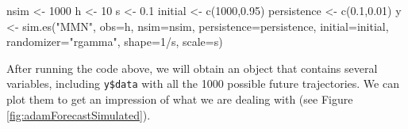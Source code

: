 \documentclass[
]{book}
\newenvironment{Shaded}{\begin{snugshade}}{\end{snugshade}}
\newcommand{\AttributeTok}[1]{\textcolor[rgb]{0.77,0.63,0.00}{#1}}
\newcommand{\ControlFlowTok}[1]{\textcolor[rgb]{0.13,0.29,0.53}{\textbf{#1}}}
\newcommand{\DecValTok}[1]{\textcolor[rgb]{0.00,0.00,0.81}{#1}}
\newcommand{\FloatTok}[1]{\textcolor[rgb]{0.00,0.00,0.81}{#1}}
\newcommand{\FunctionTok}[1]{\textcolor[rgb]{0.00,0.00,0.00}{#1}}
\newcommand{\NormalTok}[1]{#1}
\newcommand{\OtherTok}[1]{\textcolor[rgb]{0.56,0.35,0.01}{#1}}
\newcommand{\SpecialCharTok}[1]{\textcolor[rgb]{0.00,0.00,0.00}{#1}}
\newcommand{\StringTok}[1]{\textcolor[rgb]{0.31,0.60,0.02}{#1}}
\theoremstyle{definition}
\theoremstyle{definition}
\theoremstyle{definition}
\theoremstyle{definition}
\theoremstyle{remark}
\begin{document}
\begin{Shaded}
\begin{Highlighting}[]
\NormalTok{nsim }\OtherTok{\textless{}{-}} \DecValTok{1000}
\NormalTok{h }\OtherTok{\textless{}{-}} \DecValTok{10}
\NormalTok{s }\OtherTok{\textless{}{-}} \FloatTok{0.1}
\NormalTok{initial }\OtherTok{\textless{}{-}} \FunctionTok{c}\NormalTok{(}\DecValTok{1000}\NormalTok{,}\FloatTok{0.95}\NormalTok{)}
\NormalTok{persistence }\OtherTok{\textless{}{-}} \FunctionTok{c}\NormalTok{(}\FloatTok{0.1}\NormalTok{,}\FloatTok{0.01}\NormalTok{)}
\NormalTok{y }\OtherTok{\textless{}{-}} \FunctionTok{sim.es}\NormalTok{(}\StringTok{"MMN"}\NormalTok{, }\AttributeTok{obs=}\NormalTok{h, }\AttributeTok{nsim=}\NormalTok{nsim, }\AttributeTok{persistence=}\NormalTok{persistence,}
            \AttributeTok{initial=}\NormalTok{initial, }\AttributeTok{randomizer=}\StringTok{"rgamma"}\NormalTok{,}
            \AttributeTok{shape=}\DecValTok{1}\SpecialCharTok{/}\NormalTok{s, }\AttributeTok{scale=}\NormalTok{s)}
\end{Highlighting}
\end{Shaded}

After running the code above, we will obtain an object that contains several variables, including \texttt{y\$data} with all the 1000 possible future trajectories. We can plot them to get an impression of what we are dealing with (see Figure \ref{fig:adamForecastSimulated}).

\begin{Shaded}
\end{Shaded}
\end{document}
